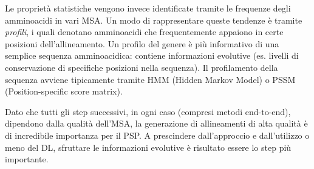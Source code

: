 \par Le proprietà statistiche vengono invece identificate tramite le frequenze degli amminoacidi in vari MSA. Un modo di rappresentare queste tendenze è tramite \textit{profili}, i quali denotano amminoacidi che frequentemente appaiono in certe posizioni dell'allineamento. Un profilo del genere è più informativo di una semplice sequenza amminoacidica: contiene informazioni evolutive (es. livelli di conservazione di specifiche posizioni nella sequenza). Il profilamento della sequenza avviene tipicamente tramite HMM (Hidden Markov Model) o PSSM (Position-specific score matrix).

\par Dato che tutti gli step successivi, in ogni caso (compresi metodi end-to-end), dipendono dalla qualità dell'MSA, la generazione di allineamenti di alta qualità è di incredibile importanza per il PSP. A prescindere dall'approccio e dall'utilizzo o meno del DL, sfruttare le informazioni evolutive è risultato essere lo step più importante.

